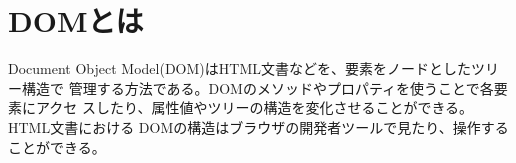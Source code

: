 \section{DOMとは}
Document Object Model(DOM)はHTML文書などを、要素をノードとしたツリー構造で
管理する方法である。DOMのメソッドやプロパティを使うことで各要素にアクセ
スしたり、属性値やツリーの構造を変化させることができる。HTML文書における
DOMの構造はブラウザの開発者ツールで見たり、操作することができる。
\iffalse
\begin{itemize}
 \item Google Chrome では開発者ツールの Elementsタブで確認できる。
 \item FireFoxでは開発ツールの「インスペクタ」タブで確認でき
       る。
\end{itemize}
\fi
\newcommand{\DOMM}{\texttt}
\newcommand{\DOMP}{\texttt}
\newcommand{\DOM}{\texttt{DOM}}
\newcommand{\keyitem}{\relax}
\newcommand{\HTML}{HTML文書}
